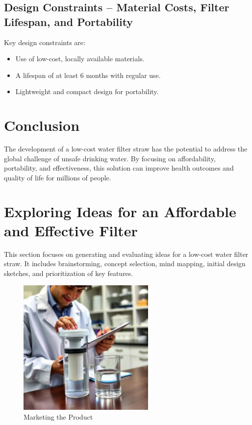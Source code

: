\documentclass{article}
\begin{document}
\vspace{0.3cm}

\subsection{Design Constraints – Material Costs, Filter Lifespan, and Portability}
Key design constraints are:
\begin{itemize}
    \item Use of low-cost, locally available materials.
    \item A lifespan of at least 6 months with regular use.
    \item Lightweight and compact design for portability.
\end{itemize}

\vspace{0.3cm}

\section*{Conclusion}
The development of a low-cost water filter straw has the potential to address the global challenge of unsafe drinking water. By focusing on affordability, portability, and effectiveness, this solution can improve health outcomes and quality of life for millions of people.

\newpage





\section{Exploring Ideas for an Affordable and Effective Filter}
This section focuses on generating and evaluating ideas for a low-cost water filter straw. It includes brainstorming, concept selection, mind mapping, initial design sketches, and prioritization of key features.


\begin{figure}[h!]
    \centering
    \includegraphics[width=0.6\textwidth]{DIY/3explore.jpg}
    \caption{Marketing the Product}
    \label{fig:market}
\end{figure}
\end{document}
